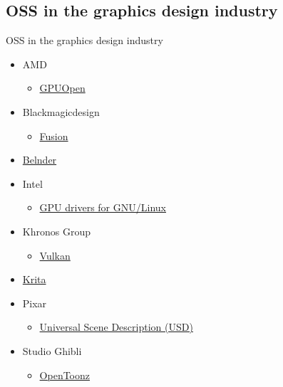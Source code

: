 \documentclass[xcolor=svgnames,handout]{beamer}
\begin{document}
\subsection{OSS in the graphics design industry}
\begin{frame}{OSS in the graphics design industry}

	\begin{itemize}
		\item AMD
			\begin{itemize}
				\item \href{http://gpuopen.com/games-cgi/}{GPUOpen}
			\end{itemize}
		\item Blackmagicdesign
			\begin{itemize}
				\item \href{https://www.blackmagicdesign.com/products/fusion}{Fusion}
			\end{itemize}
		\item \href{https://www.blender.org/}{Belnder\textsuperscript{\texttrademark}}
		\item Intel\textsuperscript{\textregistered}
			\begin{itemize}
				\item \href{https://01.org/linuxgraphics}{GPU drivers for GNU/Linux}
			\end{itemize}
		\item Khronos\textsuperscript{\texttrademark} Group
			\begin{itemize}
				\item \href{https://www.khronos.org/members/contributors}{Vulkan\textsuperscript{\texttrademark}}
			\end{itemize}
		\item \href{https://krita.org/en/}{Krita}
		\item Pixar
			\begin{itemize}
				\item \href{https://github.com/PixarAnimationStudios/USD}{Universal Scene Description (USD)}
			\end{itemize}
		\item Studio Ghibli
			\begin{itemize}
				\item \href{https://opentoonz.github.io/e/}{OpenToonz}
			\end{itemize}
	\end{itemize}

\end{frame}
\end{document}
